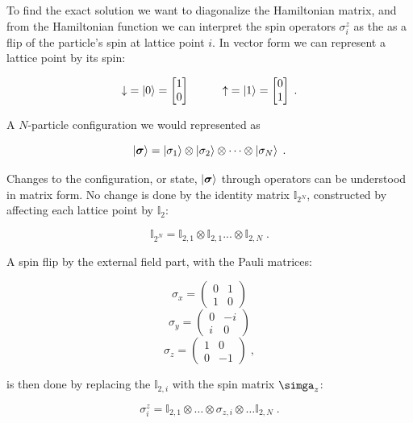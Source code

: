 To find the exact solution we want to diagonalize the Hamiltonian matrix, and from the Hamiltonian function we can interpret the spin operators $\sigma_i^z$ as the as a flip of the particle's spin at lattice point $i$. In vector form we can represent a lattice point by its spin:

\begin{equation}
  \downarrow \; = \ket{0} = \begin{bmatrix}
    1 \\ 0
    \end{bmatrix} \space\space\space\;\;\;\;\;\;\; \;\;\; \space\space\space \uparrow \; = \ket{1} = \begin{bmatrix}
  0 \\ 1
  \end{bmatrix} \; .
  \label{eq:ising_basis}
\end{equation}

A $N$-particle configuration we would represented as

$$\ket{\boldsymbol{\sigma}} = \ket{\sigma_1} \otimes \ket{\sigma_2} \otimes \dots \otimes \ket{\sigma_N} \; .$$

Changes to the configuration, or state, $\ket{\boldsymbol{\sigma}}$ through operators can be understood in matrix form. No change is done by the identity matrix $\mathbb{I}_{2^N}$, constructed by affecting each lattice point by $\mathbb{I}_2$:

$$\mathbb{I}_{2^N} = \mathbb{I}_{2, 1} \otimes \mathbb{I}_{2, 1} ... \otimes \mathbb{I}_{2, N} \; .$$

A spin flip by the external field part, with the Pauli matrices:

\[
\sigma_x =
\begin{pmatrix}0&1\\1&0\end{pmatrix}
\]
\[
\sigma_y =
\begin{pmatrix}0&-i\\i&0\end{pmatrix} 
\]
\[
\sigma_z =
\begin{pmatrix}1&0\\0&-1\end{pmatrix} \; ,
\] 

is then done by replacing the $\mathbb{I}_{2, i}$ with the spin matrix $\simga_z$:

\begin{equation}
  \sigma_i^z = \mathbb{I}_{2, 1} \otimes \dots \otimes \sigma_{z, i} \otimes \dots \mathbb{I}_{2, N} \; .
  \label{eq:state_spin_z}
\end{equation}

